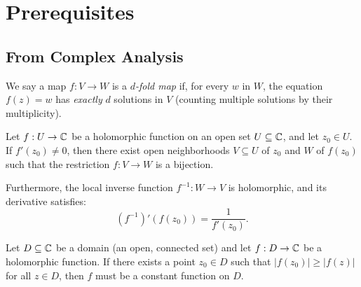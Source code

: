 \maketitle

\chapter*{Prerequisites}

\section*{From Complex Analysis}

\begin{definition*}
    We say a map $f: V \to W$ is a \emph{$d$-fold map} if, for every $w$ in $W$,
    the equation $f(z) = w$ has \emph{exactly} $d$ solutions in $V$ (counting
    multiple solutions by their multiplicity).
\end{definition*}

\begin{theorem*}
    Let $f: U \to \mathbb{C}$ be a holomorphic function on an open set $U \subseteq \mathbb{C}$,
    and let $z_0 \in U$. If $f'(z_0) \neq 0$, then there exist open
    neighborhoods $V \subseteq U$ of $z_0$ and $W$ of $f(z_0)$ such that the
    restriction $f: V \to W$ is a bijection.
    
    Furthermore, the local inverse function $f^{-1}: W \to V$ is holomorphic,
    and its derivative satisfies:
    \begin{equation*}
        (f^{-1})'(f(z_0)) = \frac{1}{f'(z_0)}.
    \end{equation*}
\end{theorem*}

\begin{theorem*}
    Let $D \subseteq \mathbb{C}$ be a domain (an open, connected set) and let $f: D \to \mathbb{C}$
    be a holomorphic function. If there exists a point $z_0 \in D$ such that
    $|f(z_0)| \geq |f(z)|$ for all $z \in D$, then $f$ must be a constant
    function on $D$.
\end{theorem*}


